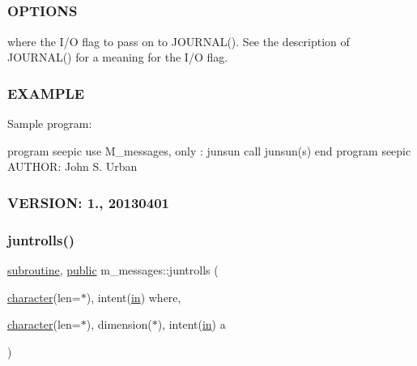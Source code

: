 \subparagraph*{}

\subparagraph*{}

\subsubsection*{O\+P\+T\+I\+O\+NS}

\begin{DoxyVerb}   where    the I/O flag to pass on to JOURNAL().
            See the description of JOURNAL() for a meaning for the I/O flag.
\end{DoxyVerb}


\subsubsection*{E\+X\+A\+M\+P\+LE}

Sample program\+:

program seepic use M\+\_\+messages, only \+: junsun call junsun(\textquotesingle{}s\textquotesingle{}) end program seepic A\+U\+T\+H\+OR\+: John S. Urban \subsubsection*{V\+E\+R\+S\+I\+ON\+: 1., 20130401}\mbox{\label{namespacem__messages_ab7a9bba52e514a4183070ae0fc6ccebd}} 
\subsubsection{\texorpdfstring{juntrolls()}{juntrolls()}}
{\footnotesize\ttfamily \hyperlink{M__stopwatch_83_8txt_acfbcff50169d691ff02d4a123ed70482}{subroutine}, \hyperlink{M__stopwatch_83_8txt_a2f74811300c361e53b430611a7d1769f}{public} m\+\_\+messages\+::juntrolls (\begin{DoxyParamCaption}\item[{\hyperlink{option__stopwatch_83_8txt_abd4b21fbbd175834027b5224bfe97e66}{character}(len=$\ast$), intent(\hyperlink{M__journal_83_8txt_afce72651d1eed785a2132bee863b2f38}{in})}]{where,  }\item[{\hyperlink{option__stopwatch_83_8txt_abd4b21fbbd175834027b5224bfe97e66}{character}(len=$\ast$), dimension($\ast$), intent(\hyperlink{M__journal_83_8txt_afce72651d1eed785a2132bee863b2f38}{in})}]{a }\end{DoxyParamCaption})}



